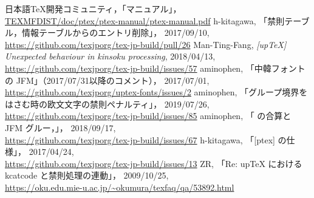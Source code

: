 \documentclass[paper=a4,twocolumn,line_length=24zw,number_of_lines=43]{jlreq}
\begin{document}
\begin{thebibliography}{9}\footnotesize
  日本語\TeX 開発コミュニティ，「\pTeX マニュアル」，\\
  \url{TEXMFDIST/doc/ptex/ptex-manual/ptex-manual.pdf}
  h-kitagawa, 「禁則テーブル，情報テーブルからのエントリ削除」，
  2017/09/10,\\
  \url{https://github.com/texjporg/tex-jp-build/pull/26}
  Man-Ting-Fang, \textit{[upTeX] Unexpected behaviour in kinsoku processing},
  2018/04/13,\\
  \url{https://github.com/texjporg/tex-jp-build/issues/57}
  aminophen, 「中韓フォントの JFM」（2017/07/31以降のコメント），
  2017/07/01,\\
  \url{https://github.com/texjporg/uptex-fonts/issues/2}
  aminophen, 「グループ境界をはさむ時の欧文文字の禁則ペナルティ」，
  2019/07/26,\\
  \url{https://github.com/texjporg/tex-jp-build/issues/85}
  aminophen, 「 の合算と JFM グルー，」，
  2018/09/17,\\
  \url{https://github.com/texjporg/tex-jp-build/issues/67}
  h-kitagawa, 「[ptex]  の仕様」，
  2017/04/24,\\
  \url{https://github.com/texjporg/tex-jp-build/issues/13}
  ZR, 「Re: upTeX における kcatcode と禁則処理の連動」，
  2009/10/25,\\
  \url{https://oku.edu.mie-u.ac.jp/~okumura/texfaq/qa/53892.html}
\end{thebibliography}
\end{document}
